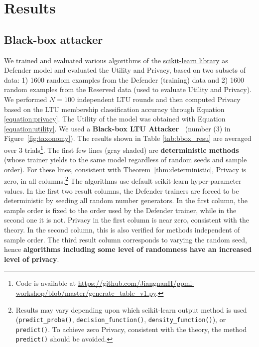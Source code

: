 \documentclass[letterpaper]{article}
\newcommand{\oracle}{LTU Attacker~}
\begin{document}

\section{Results}
\label{sec:results}

\subsection{Black-box attacker}
We trained and evaluated various algorithms of the \href{https://scikit-learn.org/stable/}{scikit-learn library} as Defender model and evaluated the Utility and Privacy, based on two subsets of data: 1) 1600 random examples from the Defender (training) data and 2) 1600 random examples from the Reserved data (used to evaluate Utility and Privacy). We performed $N=100$ independent LTU rounds and then computed  Privacy based on the LTU membership classification accuracy through Equation \ref{equation:privacy}. The Utility of the model was obtained with Equation \ref{equation:utility}. We used a {\bf Black-box \oracle} (number (3) in Figure~\ref{fig:taxonomy}).
The results shown in Table \ref{tab:bbox_resu} are averaged over 3 trials\footnote{Code is available at \url{https://github.com/JiangnanH/ppml-workshop/blob/master/generate_table_v1.py}.}. 
The first few lines (gray shaded) are {\bf deterministic methods} (whose trainer yields to the same model regardless of random seeds and sample order). For these lines, consistent with Theorem~\ref{thm:deterministic}, Privacy is zero, in all columns.\footnote{ Results may vary depending upon which scikit-learn output method is used (\texttt{predict\_proba()}, \texttt{decision\_function()}, \texttt{density\_function()}), or \texttt{predict()}. To achieve zero Privacy, consistent with the theory, the method \texttt{predict()} should be avoided.}
The algorithms use default scikit-learn hyper-parameter values. 
In the first two result columns, the Defender trainers are forced to be deterministic by seeding all random number generators. In the first column, the sample order is fixed to the order used by the Defender trainer, while in the second one it is not. Privacy in the first column is near zero, consistent with the theory. In the second column, this is also verified for methods independent of sample order.
The third result column corresponds to varying the random seed, hence {\bf algorithms including some level of randomness have an increased level of privacy}.
\end{document}
